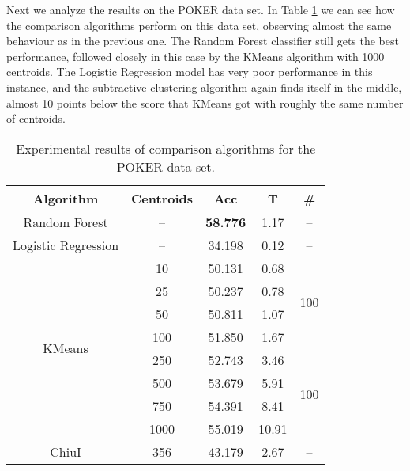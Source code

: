 Next we analyze the results on the POKER data set. In Table \ref{tab:poker1} we can see how the comparison algorithms perform on this data set, observing almost the same behaviour as in the previous one. The Random Forest classifier still gets the best performance, followed closely in this case by the KMeans algorithm with 1000 centroids. The Logistic Regression model has very poor performance in this instance, and the subtractive clustering algorithm again finds itself in the middle, almost 10 points below the score that KMeans got with roughly the same number of centroids.

\begin{table}[h!]
\centering
\caption{Experimental results of comparison algorithms for the POKER data set.}
\label{tab:poker1}
\begin{tabular}{ccccc}
\toprule
Algorithm      & Centroids & Acc     & T & \#          \\ \midrule
Random Forest                     & --                   & \textbf{58.776}                    & 1.17       & --                    \\
Logistic Regression                   & --                   & 34.198                   & 0.12       & --                    \\
\multirow{8}{*}{KMeans} & 10                  & 50.131   & 0.68       & \multirow{4}{*}{100} \\
                        & 25                  & 50.237        & 0.78       &                      \\
                        & 50                  & 50.811                      & 1.07       &                      \\
                        & 100                 & 51.850                       & 1.67       &                      \\ \cline{2-5}
                        & 250                 & 52.743                          & 3.46       &          \multirow{4}{*}{100}            \\
                        & 500                 & 53.679                      & 5.91       &                      \\
                        & 750                 & 54.391                         & 8.41       &                      \\
                        & 1000                & 55.019                 & 10.91      &                      \\
ChiuI                   & 356                 & 43.179                       & 2.67       & --                    \\ \bottomrule
\end{tabular}
\end{table}

